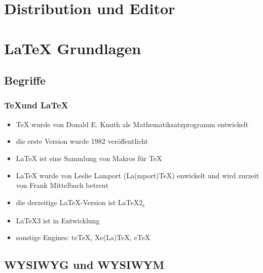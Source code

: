 \documentclass[xelatex,hyperref=xdvipdfmx,11pt]{beamer}
\begin{document}


\section{Distribution und Editor}
\label{sec:install}

\frame{


}

\section{\LaTeX{} Grundlagen}
\label{sec:grundlagen}

\subsection{Begriffe}
\label{sec:begriffe}

\begin{frame}
\frametitle{\TeX und \LaTeX}

\begin{itemize}
\item \TeX{} wurde von Donald E. Knuth als Mathematiksatzprogramm entwickelt
\item die erste Version wurde 1982 veröffentlicht
\item \LaTeX{} ist eine Sammlung von Makros für \TeX
\item \LaTeX{} wurde von Leslie Lamport (La(mport)\TeX ) enwickelt und wird zurzeit
     von Frank Mittelbach betreut
\item die derzeitige \LaTeX -Version ist LaTeX2\textsubscript{$\epsilon$}
\item \LaTeX 3 ist in Entwicklung
\item sonstige Engines: teTeX, Xe(La)\TeX{}, eTeX
\end{itemize}
\end{frame}


\subsection{WYSIWYG und WYSIWYM}
\label{sec:wysiwym}
\end{document}

